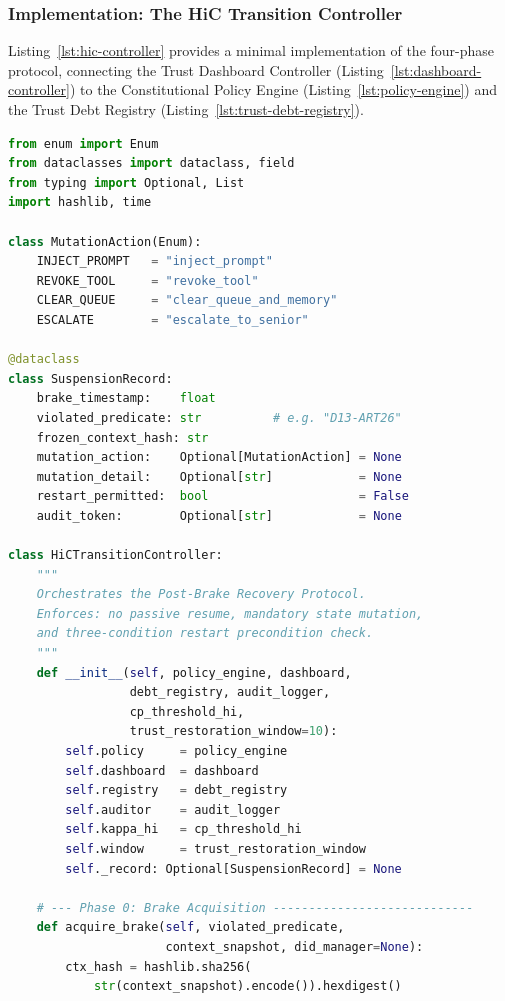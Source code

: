 \subsubsection*{Implementation: The HiC Transition Controller}

Listing~\ref{lst:hic-controller} provides a minimal implementation of the
four-phase protocol, connecting the Trust Dashboard Controller
(Listing~\ref{lst:dashboard-controller}) to the Constitutional Policy Engine
(Listing~\ref{lst:policy-engine}) and the Trust Debt Registry
(Listing~\ref{lst:trust-debt-registry}).

\begin{lstlisting}[language=Python, style=pythonstyle,
  caption={HiC Transition Controller: orchestrates the four-phase
           Post-Brake Recovery Protocol, enforcing state mutation before
           agent re-engagement.},
  label={lst:hic-controller}]
from enum import Enum
from dataclasses import dataclass, field
from typing import Optional, List
import hashlib, time

class MutationAction(Enum):
    INJECT_PROMPT   = "inject_prompt"
    REVOKE_TOOL     = "revoke_tool"
    CLEAR_QUEUE     = "clear_queue_and_memory"
    ESCALATE        = "escalate_to_senior"

@dataclass
class SuspensionRecord:
    brake_timestamp:    float
    violated_predicate: str          # e.g. "D13-ART26"
    frozen_context_hash: str
    mutation_action:    Optional[MutationAction] = None
    mutation_detail:    Optional[str]            = None
    restart_permitted:  bool                     = False
    audit_token:        Optional[str]            = None

class HiCTransitionController:
    """
    Orchestrates the Post-Brake Recovery Protocol.
    Enforces: no passive resume, mandatory state mutation,
    and three-condition restart precondition check.
    """
    def __init__(self, policy_engine, dashboard,
                 debt_registry, audit_logger,
                 cp_threshold_hi,
                 trust_restoration_window=10):
        self.policy     = policy_engine
        self.dashboard  = dashboard
        self.registry   = debt_registry
        self.auditor    = audit_logger
        self.kappa_hi   = cp_threshold_hi
        self.window     = trust_restoration_window
        self._record: Optional[SuspensionRecord] = None

    # --- Phase 0: Brake Acquisition ----------------------------
    def acquire_brake(self, violated_predicate,
                      context_snapshot, did_manager=None):
        ctx_hash = hashlib.sha256(
            str(context_snapshot).encode()).hexdigest()


\end{lstlisting}
